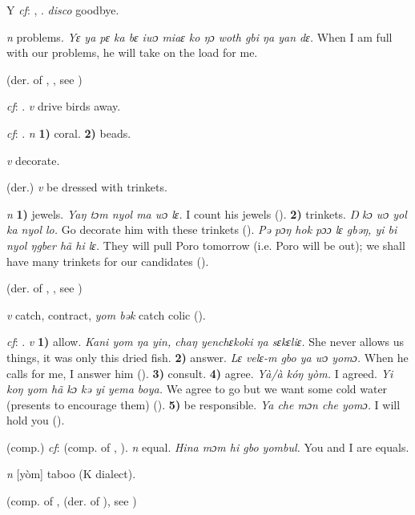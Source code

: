 \begin{letter}{Y}
 \textit{cf}: , . \textit{disco} goodbye.

 \textit{n} problems. \textit{Yɛ ya pɛ ka bɛ iwɔ miaɛ ko ŋɔ woth gbi ŋa yan dɛ.} When I am full with our problems, he will take on the load for me.

 (der. of , , see ) 

 \textit{cf}: . \textit{v} drive birds away.

 \textit{cf}: . \textit{n} \textbf{1)} coral. \textbf{2)} beads.

 \textit{v} decorate.

 (der.) \textit{v} be dressed with trinkets.

 \textit{n} \textbf{1)} jewels. \textit{Yaŋ tɔm nyol ma wɔ lɛ.} I count his jewels (\citealt{Pichl1967}). \textbf{2)} trinkets. \textit{Ŋ kɔ wɔ yol ka nyol lo.} Go decorate him with these trinkets (\citealt{Pichl1967}). \textit{Pə pɔŋ hok pɔɔ lɛ gbəŋ, yi bi nyol ŋgber hã hi lɛ.} They will pull Poro tomorrow (i.e. Poro will be out); we shall have many trinkets for our candidates (\citealt{Pichl1967}). 

 (der. of , , see ) 

 \textit{v} catch, contract, \textit{yom bək} catch colic (\citealt{Pichl1967}). 

 \textit{cf}: . \textit{v} \textbf{1)} allow. \textit{Kani yom ŋa yin, chaŋ yenchɛkoki ŋa sɛkɛliɛ.} She never allows us things, it was only this dried fish. \textbf{2)} answer. \textit{Lɛ velɛ-m gbo ya wɔ yomɔ.} When he calls for me, I answer him (\citealt{Pichl1967}). \textbf{3)} consult. \textbf{4)} agree. \textit{Yà/à kóŋ yòm.} I agreed. \textit{Yi koŋ yom hã kɔ kə yi yema boya.} We agree to go but we want some cold water (presents to encourage them) (\citealt{Pichl1967}). \textbf{5)} be responsible. \textit{Ya che mɔn che yomɔ.} I will hold you (\citealt{Pichl1967}).

 (comp.) \textit{cf}:  (comp. of , ). \textit{n} equal. \textit{Hina mɔm hi gbo yombul.} You and I are equals.

 \textit{n} [yòm] taboo (K dialect). 

 (comp. of ,  (der. of ), see ) 


\end{letter}
